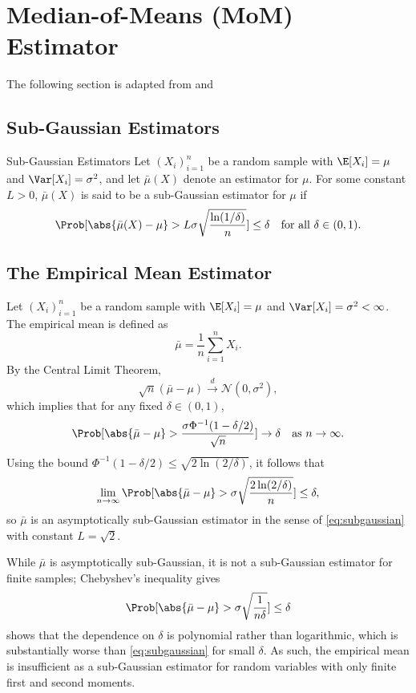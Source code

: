 \section{Median-of-Means (MoM) Estimator}
The following section is adapted from \cite{devroye2016sub} and \cite{lugosi2019mean}


\subsection{Sub-Gaussian Estimators}
\begin{definition}{Sub-Gaussian Estimators}
Let $(X_i)_{i=1}^{n}$ be a random sample with $\E[X_i] = \mu$ and $\Var[X_i] = \sigma^2$, and let $\bar{\mu}(X)$ denote an estimator for $\mu$. For some constant $L > 0$, $\bar{\mu}(X)$ is said to be a sub-Gaussian estimator for $\mu$ if 
\begin{equation}
\label{eq:subgaussian}
    \Prob[\abs{\bar{\mu}(X) - \mu} > L\sigma \sqrt{\frac{\ln(1/\delta)}{n}}] \leq \delta \quad \text{for all } \delta \in (0,1).
\end{equation}
\end{definition}

\subsection{The Empirical Mean Estimator}
Let $(X_i)_{i=1}^{n}$ be a random sample with $\E[X_i] = \mu$ and $\Var[X_i] = \sigma^2 < \infty$. 
The empirical mean is defined as
\[
\bar{\mu} = \frac{1}{n}\sum_{i=1}^{n} X_i.
\]
By the Central Limit Theorem,
\[
\sqrt{n}(\bar{\mu} - \mu) \overset{d}{\to} \mathcal{N}(0, \sigma^2),
\]
which implies that for any fixed $\delta \in (0,1)$,
\[
\Prob[\abs{\bar{\mu} - \mu} > \frac{\sigma \Phi^{-1}(1-\delta/2)}{\sqrt{n}}] \to \delta 
\quad \text{as } n \to \infty.
\]
Using the bound $\Phi^{-1}(1-\delta/2) \leq \sqrt{2\ln(2/\delta)}$, it follows that 
\[
\lim_{n \to \infty} \Prob[\abs{\bar{\mu} - \mu} > \sigma\sqrt{\frac{2\ln(2/\delta)}{n}}] \leq \delta,
\]
so $\bar{\mu}$ is an asymptotically sub-Gaussian estimator in the sense of \eqref{eq:subgaussian} with constant $L = \sqrt{2}$.

While $\bar{\mu}$ is asymptotically sub-Gaussian, it is not a sub-Gaussian estimator for finite samples; Chebyshev's inequality gives 
\[
\Prob[\abs{\bar{\mu} - \mu} > \sigma\sqrt{\frac{1}{n\delta}}] \leq \delta
\]
shows that the dependence on $\delta$ is polynomial rather than logarithmic, 
which is substantially worse than \eqref{eq:subgaussian} for small $\delta$. As such, the empirical mean is insufficient as a sub-Gaussian estimator for random variables with only finite first and second moments.

